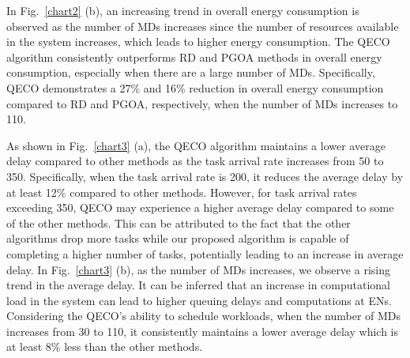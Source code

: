 \documentclass[12pt,draftclsnofoot,onecolumn]{IEEEtran}
\begin{document}
In Fig.~\ref{chart2} (b), an increasing trend in overall energy consumption is observed as the number of MDs increases since the number of resources available in the system increases, which leads to higher energy consumption. The QECO algorithm consistently outperforms RD and PGOA methods in overall energy consumption, especially when there are a large number of MDs. Specifically, QECO demonstrates a 27\% and 16\% reduction in overall energy consumption compared to RD and PGOA, respectively, when the number of MDs increases to 110.

As shown in Fig.~\ref{chart3} (a), the QECO algorithm maintains a lower average delay compared to other methods as the task arrival rate increases from 50 to 350. Specifically, when the task arrival rate is 200, it reduces the average delay by at least 12\% compared to other methods. However, for task arrival rates exceeding 350, QECO may experience a higher average delay compared to some of the other methods. This can be attributed to the fact that the other algorithms drop more tasks while our proposed algorithm is capable of completing a higher number of tasks, potentially leading to an increase in average delay. In Fig.~\ref{chart3} (b), as the number of MDs increases, we observe a rising trend in the average delay. It can be inferred that an increase in computational load in the system can lead to higher queuing delays and computations at ENs. Considering the QECO's ability to schedule workloads, when the number of MDs increases from 30 to 110, it consistently maintains a lower average delay which is at least 8\% less than the other methods.

\end{document}
